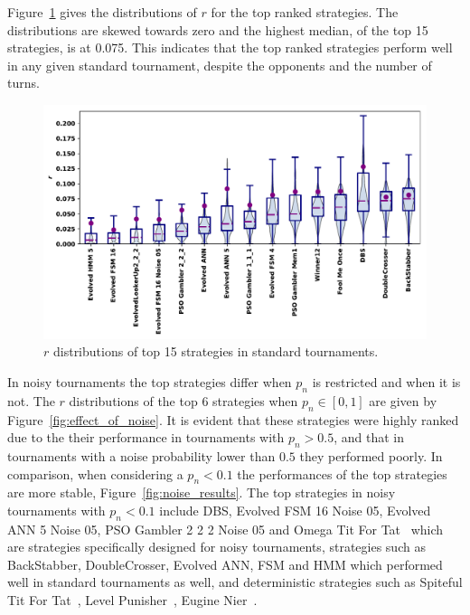 \documentclass{article}
\begin{document}
Figure~\ref{fig:std_results} gives the distributions of $r$ for the top
ranked strategies. The distributions are skewed towards zero and the highest
median, of the top 15 strategies, is at 0.075. This indicates that the top ranked
strategies perform well in any given standard tournament, despite the opponents and
the number of turns.

\begin{figure}[!htbp]
    \centering
    \includegraphics[width=.7\textwidth]{../images/performance_standard.pdf}
    \caption{$r$ distributions of top 15 strategies in standard tournaments.}\label{fig:std_results}
\end{figure}

In noisy tournaments the top strategies differ when \(p_n\) is restricted and
when it is not. The \(r\) distributions of the top 6 strategies when \(p_n\in
[0, 1]\) are given by Figure~\ref{fig:effect_of_noise}. It is evident that these
strategies were highly ranked due to the their performance in tournaments with
\(p_n>0.5\), and that in tournaments with a noise probability lower than \(0.5\) they
performed poorly. In comparison, when considering a \(p_n < 0.1\) the
performances of the top strategies are more stable,
Figure~\ref{fig:noise_results}. The top strategies in noisy tournaments with
\(p_n < 0.1\) include DBS, Evolved FSM 16 Noise 05, Evolved ANN 5 Noise 05, PSO
Gambler 2 2 2 Noise 05 and Omega Tit For Tat~\cite{kendall2007iterated} which
are strategies specifically designed for noisy tournaments, strategies such as
BackStabber, DoubleCrosser, Evolved ANN, FSM and HMM which performed well in
standard tournaments as well, and deterministic strategies such as Spiteful Tit For
Tat~\cite{prison}, Level Punisher~\cite{Eckhart2015}, Eugine Nier~\cite{lesswrong}.
\end{document}
